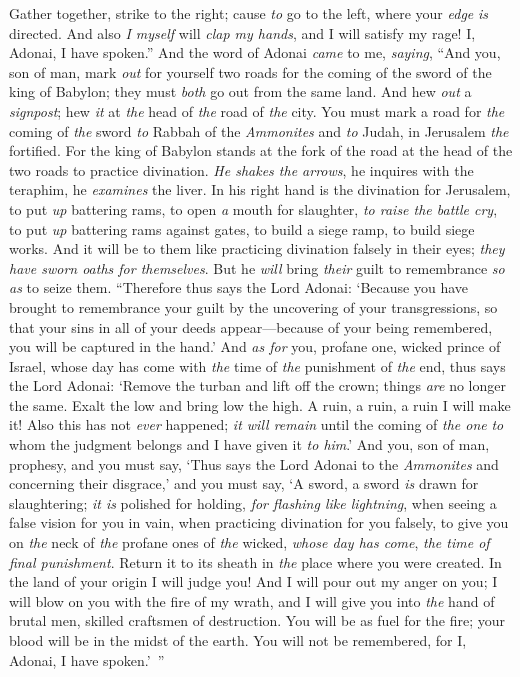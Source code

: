 \begin{biblechapter}
\verse Gather together, strike to the right; cause \textit{to} go to the left, where your \textit{edge} \textit{is} directed.
\verse And also \textit{I myself} will \textit{clap my hands}, and I will satisfy my rage! I, Adonai, I have spoken.”
\verse And the word of Adonai \textit{came} to me, \textit{saying},
\verse “And you, son of man, mark \textit{out} for yourself two roads for the coming of the sword of the king of Babylon; they must \textit{both} go out from the same land. And hew \textit{out} a \textit{signpost}; hew \textit{it} at \textit{the} head of \textit{the} road of \textit{the} city.
\verse You must mark a road for \textit{the} coming of \textit{the} sword \textit{to} Rabbah of the \textit{Ammonites} and \textit{to} Judah, in Jerusalem \textit{the} fortified.
\verse For the king of Babylon stands at the fork of the road at the head of the two roads to practice divination. \textit{He shakes the arrows}, he inquires with the teraphim, he \textit{examines} the liver.
\verse In his right hand is the divination for Jerusalem, to put \textit{up} battering rams, to open \textit{a} mouth for slaughter, \textit{to raise the battle cry}, to put \textit{up} battering rams against gates, to build a siege ramp, to build siege works.
\verse And it will be to them like practicing divination falsely in their eyes; \textit{they have sworn oaths for themselves}. But he \textit{will} bring \textit{their} guilt to remembrance \textit{so as} to seize them.
\verse “Therefore thus says the Lord Adonai: ‘Because you have brought to remembrance your guilt by the uncovering of your transgressions, so that your sins in all of your deeds appear—because of your being remembered, you will be captured in the hand.’
\verse And \textit{as for} you, profane one, wicked prince of Israel, whose day has come with \textit{the} time of \textit{the} punishment of \textit{the} end,
\verse thus says the Lord Adonai: ‘Remove the turban and lift off the crown; things \textit{are} no longer the same. Exalt the low and bring low the high.
\verse A ruin, a ruin, a ruin I will make it! Also this has not \textit{ever} happened; \textit{it will remain} until the coming of \textit{the one} \textit{to} whom the judgment belongs and I have given it \textit{to him}.’
\verse And you, son of man, prophesy, and you must say, ‘Thus says the Lord Adonai to the \textit{Ammonites} and concerning their disgrace,’ and you must say, ‘A sword, a sword \textit{is} drawn for slaughtering; \textit{it is} polished for holding, \textit{for flashing like lightning},
\verse when seeing a false vision for you in vain, when practicing divination for you falsely, to give you on \textit{the} neck of \textit{the} profane ones of \textit{the} wicked, \textit{whose day has come}, \textit{the time of final punishment}.
\verse Return it to its sheath in \textit{the} place where you were created. In the land of your origin I will judge you!
\verse And I will pour out my anger on you; I will blow on you with the fire of my wrath, and I will give you into \textit{the} hand of brutal men, skilled craftsmen of destruction.
\verse You will be as fuel for the fire; your blood will be in the midst of the earth. You will not be remembered, for I, Adonai, I have spoken.’ ”
\end{biblechapter}


